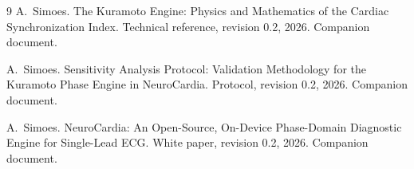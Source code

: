 \documentclass[11pt]{article}
\begin{document}
\begin{thebibliography}{9}
A.~Simoes. The Kuramoto Engine: Physics and Mathematics of the Cardiac
Synchronization Index. Technical reference, revision 0.2, 2026.
Companion document.

A.~Simoes. Sensitivity Analysis Protocol: Validation Methodology for
the Kuramoto Phase Engine in NeuroCardia. Protocol, revision 0.2,
2026. Companion document.

A.~Simoes. NeuroCardia: An Open-Source, On-Device Phase-Domain
Diagnostic Engine for Single-Lead ECG. White paper, revision 0.2,
2026. Companion document.

\end{thebibliography}
\end{document}
